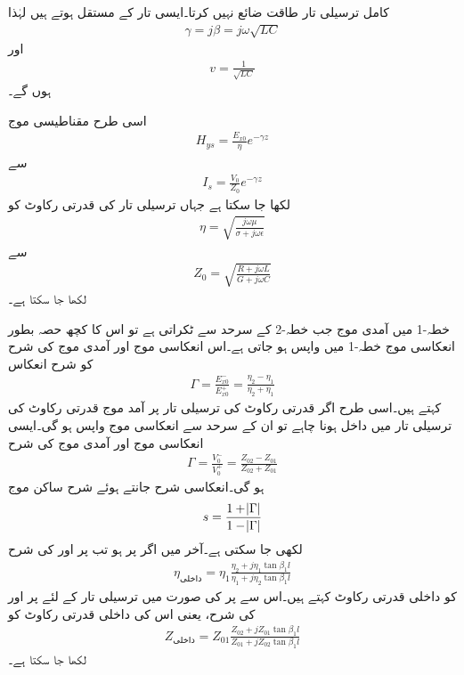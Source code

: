 کامل ترسیلی تار طاقت ضائع نہیں کرتا۔ایسی تار کے مستقل  ہوتے ہیں لہٰذا
\begin{align*}
\gamma=j \beta=j \omega \sqrt{LC}
\end{align*}
اور 
\begin{align}
v=\frac{1}{\sqrt{LC}}
\end{align}
ہوں گے۔

اسی طرح مقناطیسی موج
\begin{align*}
H_{ys}=\frac{E_{x0}}{\eta} e^{-\gamma z}
\end{align*}
سے
\begin{align}
I_s=\frac{V_0}{Z_0} e^{-\gamma z}
\end{align}
لکھا جا سکتا ہے جہاں ترسیلی تار کی قدرتی رکاوٹ  کو
\begin{align*}
\eta=\sqrt{\frac{j\omega \mu}{\sigma +j\omega \epsilon}}
\end{align*}
سے
\begin{align}
Z_0=\sqrt{\frac{R+j\omega L}{G+j \omega C}}
\end{align}
لکھا جا سکتا ہے۔

خطہ-1 میں آمدی موج جب خطہ-2 کے سرحد سے ٹکراتی ہے تو اس کا کچھ حصہ بطور انعکاسی موج خطہ-1 میں واپس ہو جاتی ہے۔اس انعکاسی موج اور آمدی موج کی شرح کو شرح انعکاس
\begin{align*}
\Gamma=\frac{E_{x0}^-}{E_{x0}^+}=\frac{\eta_2-\eta_1}{\eta_2+\eta_1}
\end{align*}
کہتے ہیں۔اسی طرح اگر  قدرتی رکاوٹ کی ترسیلی تار پر آمد موج  قدرتی رکاوٹ کی ترسیلی تار میں داخل ہونا چاہے تو ان کے سرحد سے انعکاسی موج واپس ہو گی۔ایسی انعکاسی موج اور آمدی موج کی شرح
\begin{align}
\Gamma=\frac{V_0^-}{V_0^+}=\frac{Z_{02}-Z_{01}}{Z_{02}+Z_{01}}
\end{align}
 ہو گی۔انعکاسی شرح جانتے ہوئے شرح ساکن موج
\begin{align}
s=\frac{1+\abs{\Gamma}}{1-\abs{\Gamma}}
\end{align}
لکھی جا سکتی ہے۔آخر میں اگر  پر  ہو تب  پر  اور  کی شرح 
\begin{align*}
\eta_{\text{داخلی}}=\eta_1 \frac{\eta_2+j \eta_1 \tan \beta_1 l}{\eta_1 +j \eta_2 \tan \beta_1 l}
\end{align*}
کو داخلی قدرتی رکاوٹ  کہتے ہیں۔اس سے  پر  کی صورت میں ترسیلی تار کے لئے  پر  اور  کی شرح، یعنی اس کی داخلی قدرتی رکاوٹ کو
\begin{align}\label{مساوات_ترسیلی_داخلی_قدرتی_رکاوٹ_تعریف}
Z_{\text{داخلی}}=Z_{01} \frac{Z_{02}+j Z_{01}\tan \beta_1 l}{Z_{01}+j Z_{02}\tan \beta_1 l}
\end{align}
لکھا جا سکتا ہے۔


